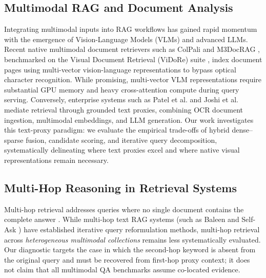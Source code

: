 \documentclass[conference]{IEEEtran}
\begin{document}
\subsection{Multimodal RAG and Document Analysis}
Integrating multimodal inputs into RAG workflows has gained rapid momentum with the emergence of Vision-Language Models (VLMs) and advanced LLMs. Recent native multimodal document retrievers such as ColPali \cite{faysse2024colpali} and M3DocRAG \cite{cho2024m3docrag}, benchmarked on the Visual Document Retrieval (ViDoRe) suite \cite{faysse2024vidore}, index document pages using multi-vector vision-language representations to bypass optical character recognition. While promising, multi-vector VLM representations require substantial GPU memory and heavy cross-attention compute during query serving. Conversely, enterprise systems such as Patel et al. \cite{patel2025multimodal} and Joshi et al. \cite{joshi2024multimodel} mediate retrieval through grounded text proxies, combining OCR document ingestion, multimodal embeddings, and LLM generation. Our work investigates this text-proxy paradigm: we evaluate the empirical trade-offs of hybrid dense--sparse fusion, candidate scoring, and iterative query decomposition, systematically delineating where text proxies excel and where native visual representations remain necessary.

\subsection{Multi-Hop Reasoning in Retrieval Systems}
Multi-hop retrieval addresses queries where no single document contains the complete answer \cite{xiong2021multihop, khattab2021baleen}. While multi-hop text RAG systems (such as Baleen \cite{khattab2021baleen} and Self-Ask \cite{press2023selfask}) have established iterative query reformulation methods, multi-hop retrieval across \textit{heterogeneous multimodal collections} remains less systematically evaluated. Our diagnostic targets the case in which the second-hop keyword is absent from the original query and must be recovered from first-hop proxy context; it does not claim that all multimodal QA benchmarks assume co-located evidence.
\end{document}
